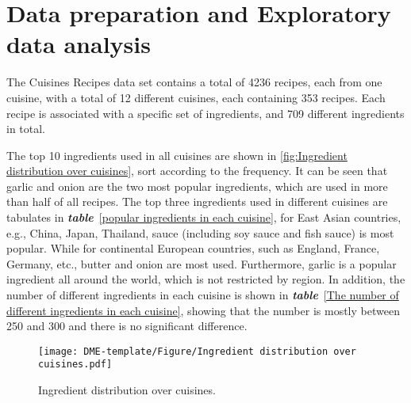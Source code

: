 \documentclass{article}
\begin{document}
\section{Data preparation and Exploratory data analysis}
The Cuisines Recipes data set contains a total of 4236 recipes, each from one cuisine, with a total of 12 different cuisines, each containing 353 recipes. Each recipe is associated with a specific set of ingredients, and 709 different ingredients in total.

The top 10 ingredients used in all cuisines are shown in  \autoref{fig:Ingredient distribution over cuisines}, sort according to the frequency. It can be seen that garlic and onion are the two most popular ingredients, which are used in more than half of all recipes. The top three ingredients used in different cuisines are tabulates in \emph{\textbf{table}}~\ref{popular ingredients in each cuisine}, for East Asian countries, e.g., China, Japan, Thailand, sauce (including soy sauce and fish sauce) is most popular. While for continental European countries, such as England, France, Germany, etc., butter and onion are most used. Furthermore, garlic is a popular ingredient all around the world, which is not restricted by region. In addition, the number of different ingredients in each cuisine is shown in  \emph{\textbf{table}}~\ref{The number of different ingredients in each cuisine}, showing that the number is mostly between 250 and 300 and there is no significant difference.

\begin{figure}[ht]
\vskip -4mm
\centering
\texttt{[image: DME-template/Figure/Ingredient distribution over cuisines.pdf]}
\vskip -4mm
\caption{Ingredient distribution over cuisines.}
\label{fig:Ingredient distribution over cuisines} 
\end{figure}
\end{document}
